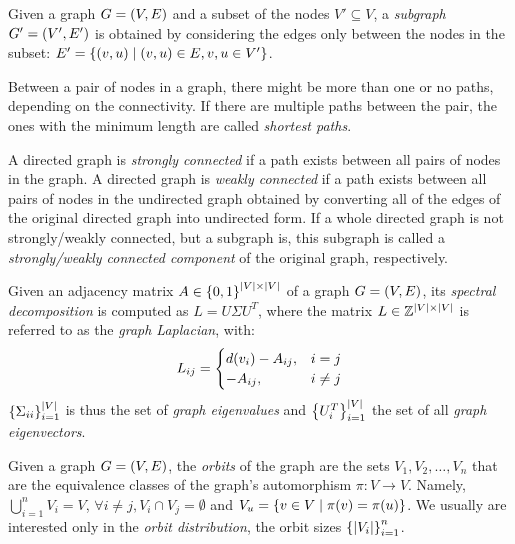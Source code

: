 \begin{definition}
Given a graph $G=\mathopen{}\left(V, E\right)$ and a subset of the nodes $V' \subseteq V$, a \emph{subgraph} $G'=\mathopen{}\left(V', E'\right)$ is obtained by considering the edges only between the nodes in the subset: $E' = \mathopen{}\left\{\mathopen{}\left(v, u\right) \mid \mathopen{}\left(v, u\right) \in E, v,u \in V'\right\}$.
\end{definition}

\begin{definition}
Between a pair of nodes in a graph, there might be more than one or no paths, depending on the connectivity. If there are multiple paths between the pair, the ones with the minimum length are called \emph{shortest paths}.
\end{definition}

\begin{definition}
A directed graph is \emph{strongly connected} if a path exists between all pairs of nodes in the graph. A directed graph is \emph{weakly connected} if a path exists between all pairs of nodes in the undirected graph obtained by converting all of the edges of the original directed graph into undirected form. If a whole directed graph is not strongly/weakly connected, but a subgraph is, this subgraph is called a \emph{strongly/weakly connected component} of the original graph, respectively.
\end{definition}

\begin{definition}
    Given an adjacency matrix $A \in \mathopen{}\left\{0,1\right\}^{\mathopen{}\left|V\right|\times\mathopen{}\left|V\right|}$ of a graph $G=\mathopen{}\left(V, E\right)$, its \emph{spectral decomposition} is computed as $L=U \Sigma U^T$, where the matrix $L\in\mathbb{Z}^{\mathopen{}\left|V\right|\times\mathopen{}\left|V\right|}$ is referred to as the \emph{graph Laplacian}, with: 
    \begin{equation}
        L_{ij}=\begin{cases}
            d\mathopen{}\left(v_i\right)-A_{ij}, & i=j \\
            -A_{ij}, & i\neq j
        \end{cases}
    \end{equation}
    $\mathopen{}\left\{\Sigma_{ii}\right\}_{i=1}^{\mathopen{}\left|V\right|}$ is thus the set of \emph{graph eigenvalues} and $\mathopen{}\left\{U^T_{i}\right\}_{i=1}^{\mathopen{}\left|V\right|}$ the set of all \emph{graph eigenvectors}.
\end{definition}

\begin{definition}
    Given a graph $G=\mathopen{}\left(V,E\right)$, the \emph{orbits} of the graph are the sets $V_1,V_2,\dots,V_n$ that are the equivalence classes of the graph's automorphism $\pi:V \to V$. Namely, $\bigcup_{i=1}^{n}{V_i}=V$, $\forall i\neq j, V_i \cap V_j=\emptyset$ and $V_u=\mathopen{}\left\{v \in V \mid \pi\mathopen{}\left(v\right)=\pi\mathopen{}\left(u\right)\right\}$. We usually are interested only in the \emph{orbit distribution}, the orbit sizes $\mathopen{}\left\{\mathopen{}\left|V_i\right|\right\}_{i=1}^{n}$.
\end{definition}

